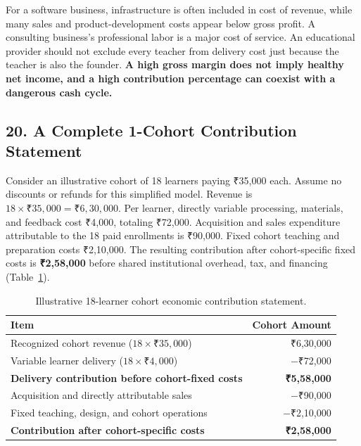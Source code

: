 For a software business, infrastructure is often included in cost of revenue, while many sales and product-development costs appear below gross profit. A consulting business's professional labor is a major cost of service. An educational provider should not exclude every teacher from delivery cost just because the teacher is also the founder. \textbf{A high gross margin does not imply healthy net income, and a high contribution percentage can coexist with a dangerous cash cycle.}

\subsection*{20. A Complete 1-Cohort Contribution Statement}

Consider an illustrative cohort of 18 learners paying ₹35,000 each. Assume no discounts or refunds for this simplified model. Revenue is $18 \times ₹35,000 = ₹6,30,000$. Per learner, directly variable processing, materials, and feedback cost ₹4,000, totaling ₹72,000. Acquisition and sales expenditure attributable to the 18 paid enrollments is ₹90,000. Fixed cohort teaching and preparation costs ₹2,10,000. The resulting contribution after cohort-specific fixed costs is \textbf{₹2,58,000} before shared institutional overhead, tax, and financing (Table~\ref{tab:cohort-contribution-statement}).

\begin{table}[htbp]
\centering
\small
\begin{tabularx}{\columnwidth}{Xr}
\toprule
\textbf{Item} & \textbf{Cohort Amount} \\
\midrule
Recognized cohort revenue ($18 \times ₹35,000$) & ₹6,30,000 \\
Variable learner delivery ($18 \times ₹4,000$) & $-$₹72,000 \\
\midrule
\textbf{Delivery contribution before cohort-fixed costs} & \textbf{₹5,58,000} \\
Acquisition and directly attributable sales & $-$₹90,000 \\
Fixed teaching, design, and cohort operations & $-$₹2,10,000 \\
\midrule
\textbf{Contribution after cohort-specific costs} & \textbf{₹2,58,000} \\
\bottomrule
\end{tabularx}
\caption{Illustrative 18-learner cohort economic contribution statement.}
\label{tab:cohort-contribution-statement}
\end{table}

